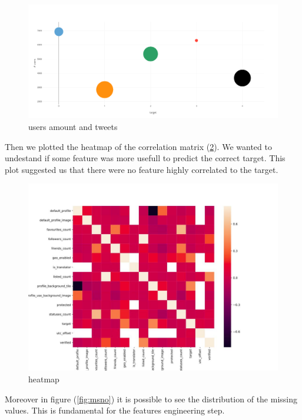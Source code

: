 \begin{figure}[htp!]
	\centering
	\includegraphics[width=\columnwidth]{chapter3/figure/bubble.png}
	\caption{users amount and tweets}
	\label{fig:bubble}
\end{figure}

Then we plotted the heatmap of the correlation matrix (\ref{fig:heatmap}). We wanted to undestand if some feature was more usefull to predict the correct target. This plot suggested us that there were no feature highly correlated to the target.
\begin{figure}
	\centering
	\includegraphics[width=\columnwidth]{chapter3/figure/heatmap.jpg}
	\caption{heatmap}
	\label{fig:heatmap}
\end{figure}

Moreover in figure (\ref{fig:msno}) it is possible to see the distribution of the missing values. This is fundamental for the features engineering step.

